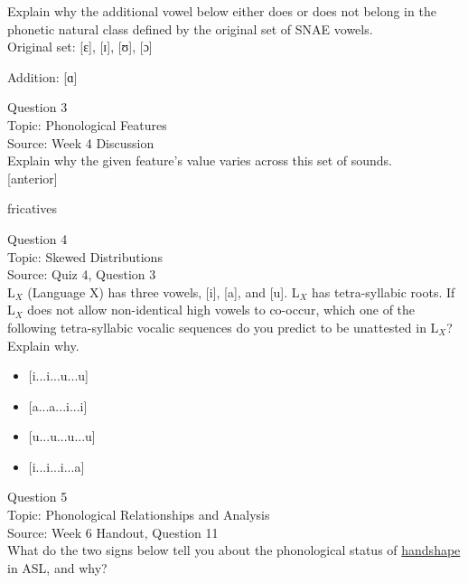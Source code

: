 \documentclass[12pt]{article}
\begin{document}
Explain why the additional vowel below either does or does not belong in the phonetic natural class defined by the original set of SNAE vowels.\\

Original set: {[ɛ]}, {[ɪ]}, {[ʊ]}, {[ɔ]}

Addition: {[ɑ]}


\newpage

{\large Question 3}\\

Topic: Phonological Features\\
Source: Week 4 Discussion\\

Explain why the given feature's value varies across this set of sounds.\\

{[anterior]}

fricatives


\newpage

{\large Question 4}\\

Topic: Skewed Distributions\\
Source: Quiz 4, Question 3\\

L$_X$ (Language X) has three vowels, [i], [a], and [u]. L$_X$ has tetra-syllabic roots. If L$_X$ does not allow non-identical high vowels to co-occur, which one of the following tetra-syllabic vocalic sequences do you predict to be unattested in L$_X$? Explain why.\\

\begin{itemize} \item {[i...i...u...u]} \item {[a...a...i...i]} \item {[u...u...u...u]} \item {[i...i...i...a]} \end{itemize}


\newpage

{\large Question 5}\\

Topic: Phonological Relationships and Analysis\\
Source: Week 6 Handout, Question 11\\

What do the two signs below tell you about the phonological status of \underline{handshape} in ASL, and why?\\
\end{document}

